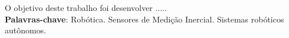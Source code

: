 
\begin{resumo}[RESUMO]
\begin{SingleSpacing}


O objetivo deste trabalho foi desenvolver .....\\

\textbf{Palavras-chave}: Robótica. Sensores de Medição Inercial. Sistemas robóticos autônomos. 

\end{SingleSpacing}
\end{resumo}



